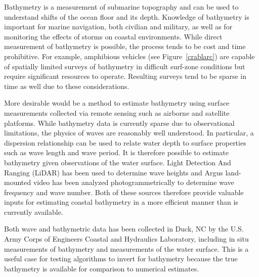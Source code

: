 Bathymetry is a measurement of submarine topography and can be used to understand shifts of the ocean floor and its depth. Knowledge of bathymetry is important for marine navigation, both civilian and military, as well as for monitoring the effects of storms on coastal environments. While direct measurement of bathymetry is possible, the process tends to be cost and time prohibitive. For example, amphibious vehicles (see Figure~\ref{crablarc}) are capable of spatially limited surveys of bathymetry in difficult surf-zone conditions but require significant resources to operate. Resulting surveys tend to be sparse in time as well due to these considerations. 

More desirable would be a method to estimate bathymetry using surface measurements collected via remote sensing such as airborne and satellite platforms. While bathymetry data is currently sparse due to observational limitations, the physics of waves are reasonably well understood. In particular, a dispersion relationship can be used to relate water depth to surface properties such as wave length and wave period. It is therefore possible to estimate bathymetry given observations of the water surface. Light Detection And Ranging (LiDAR) has been used to determine wave heights and Argus land-mounted video has been analyzed photogrammetrically to determine wave frequency and wave number. Both of these sources therefore provide valuable inputs for estimating coastal bathymetry in a more efficient manner than is currently available.


Both wave and bathymetric data has been collected in Duck, NC by the U.S. Army Corps of Engineers Coastal and Hydraulics Laboratory, including in situ measurements of bathymetry and measurements of the water surface. This is a useful case for testing algorithms to invert for bathymetry because the true bathymetry is available for comparison to numerical estimates.
